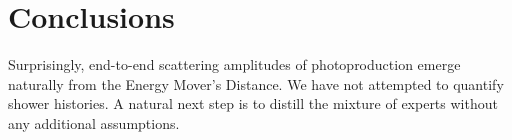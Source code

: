 \section{Conclusions}\label{sec:conclusions}

Surprisingly, end-to-end scattering amplitudes of photoproduction emerge
naturally from the Energy Mover's Distance. We have not attempted to
quantify shower histories. A natural next step is to distill the mixture
of experts without any additional assumptions.


